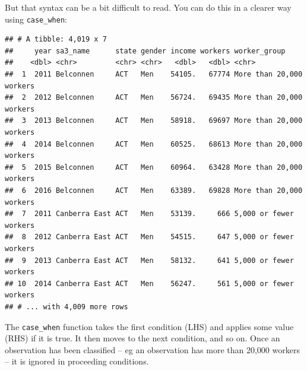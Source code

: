 \documentclass[]{book}
\newenvironment{Shaded}{\begin{snugshade}}{\end{snugshade}}
\newcommand{\DataTypeTok}[1]{\textcolor[rgb]{0.13,0.29,0.53}{#1}}
\newcommand{\DecValTok}[1]{\textcolor[rgb]{0.00,0.00,0.81}{#1}}
\newcommand{\KeywordTok}[1]{\textcolor[rgb]{0.13,0.29,0.53}{\textbf{#1}}}
\newcommand{\NormalTok}[1]{#1}
\newcommand{\OperatorTok}[1]{\textcolor[rgb]{0.81,0.36,0.00}{\textbf{#1}}}
\newcommand{\StringTok}[1]{\textcolor[rgb]{0.31,0.60,0.02}{#1}}
\begin{document}
But that syntax can be a bit difficult to read. You can do this in a clearer way using \texttt{case\_when}:

\begin{Shaded}
\end{Shaded}

\begin{verbatim}
## # A tibble: 4,019 x 7
##     year sa3_name      state gender income workers worker_group            
##    <dbl> <chr>         <chr> <chr>   <dbl>   <dbl> <chr>                   
##  1  2011 Belconnen     ACT   Men    54105.   67774 More than 20,000 workers
##  2  2012 Belconnen     ACT   Men    56724.   69435 More than 20,000 workers
##  3  2013 Belconnen     ACT   Men    58918.   69697 More than 20,000 workers
##  4  2014 Belconnen     ACT   Men    60525.   68613 More than 20,000 workers
##  5  2015 Belconnen     ACT   Men    60964.   63428 More than 20,000 workers
##  6  2016 Belconnen     ACT   Men    63389.   69828 More than 20,000 workers
##  7  2011 Canberra East ACT   Men    53139.     666 5,000 or fewer workers  
##  8  2012 Canberra East ACT   Men    54515.     647 5,000 or fewer workers  
##  9  2013 Canberra East ACT   Men    58132.     641 5,000 or fewer workers  
## 10  2014 Canberra East ACT   Men    56247.     561 5,000 or fewer workers  
## # ... with 4,009 more rows
\end{verbatim}

The \texttt{case\_when} function takes the first condition (LHS) and applies some value (RHS) if it is true. It then moves to the next condition, and so on. Once an observation has been classified -- eg an observation has more than 20,000 workers -- it is ignored in proceeding conditions.
\end{document}
